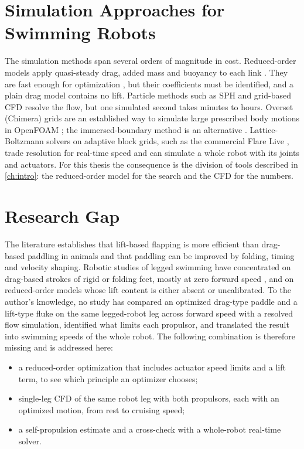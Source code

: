 \section{Simulation Approaches for Swimming Robots}
\label{sec:rw-sim}

The simulation methods span several orders of magnitude in cost. Reduced-order models apply quasi-steady drag,
added mass and buoyancy to each link \cite{Morison1950,Fossen1994}. They are fast enough for optimization
\cite{Chen2021,Heber2026,Lee2025}, but their coefficients must be identified, and a plain drag model contains
no lift. Particle methods such as SPH and grid-based CFD resolve the flow, but one simulated second takes
minutes to hours. Overset (Chimera) grids are an established way to simulate large prescribed body motions in
OpenFOAM \cite{Weller1998,Windt2020}; the immersed-boundary method is an alternative \cite{Wang2025}.
Lattice-Boltzmann solvers on adaptive block grids, such as the commercial Flare Live \cite{FlareLive}, trade
resolution for real-time speed and can simulate a whole robot with its joints and actuators. For this thesis the consequence is
the division of tools described in \cref{ch:intro}: the reduced-order model for the search and the CFD for the numbers.

\section{Research Gap}
\label{sec:rw-gap}

The literature establishes that lift-based flapping is more efficient than drag-based paddling in animals
and that paddling can be improved by folding, timing and velocity shaping. Robotic studies of legged swimming
have concentrated on drag-based strokes of rigid or folding feet, mostly at zero forward speed
\cite{Wang2025,Qu2025}, and on reduced-order models whose lift content is either absent or uncalibrated.
To the author's knowledge, no study has compared an optimized drag-type paddle and a lift-type fluke on the
same legged-robot leg across forward speed with a resolved flow simulation, identified what limits each
propulsor, and translated the result into swimming speeds of the whole robot. The following combination is
therefore missing and is addressed here:
\begin{itemize}
  \item a reduced-order optimization that includes actuator speed limits and a lift term, to see which
        principle an optimizer chooses;
  \item single-leg CFD of the same robot leg with both propulsors, each with an optimized motion, from rest to
        cruising speed;
  \item a self-propulsion estimate and a cross-check with a whole-robot real-time solver.
\end{itemize}

